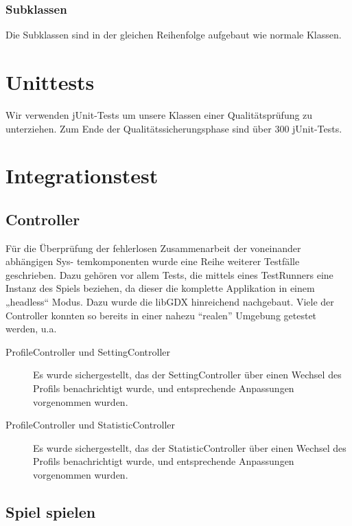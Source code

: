 \documentclass[parskip=full]{scrreprt}
\begin{document}
\subsection{Subklassen}
Die Subklassen sind in der gleichen Reihenfolge aufgebaut wie normale Klassen.



\chapter{Unittests}

Wir verwenden jUnit-Tests um unsere Klassen einer Qualitätsprüfung zu unterziehen. Zum Ende der Qualitätssicherungsphase sind über 300 jUnit-Tests.

\chapter{Integrationstest}



\section{Controller}

Für die Überprüfung der fehlerlosen Zusammenarbeit der voneinander abhängigen Sys- temkomponenten wurde eine Reihe weiterer Testfälle geschrieben. Dazu gehören vor allem Tests, die mittels eines TestRunners eine Instanz des Spiels beziehen, da dieser die komplette Applikation in einem „headless“ Modus. Dazu wurde die libGDX hinreichend nachgebaut. Viele der Controller konnten so bereits in einer nahezu \enquote{realen} Umgebung getestet werden, u.a.

\begin{description}
	\item[ProfileController und SettingController] Es wurde sichergestellt, das der SettingController über einen Wechsel des Profils benachrichtigt wurde, und entsprechende Anpassungen vorgenommen wurden.
	\item[ProfileController und StatisticController] Es wurde sichergestellt, das der StatisticController über einen Wechsel des Profils benachrichtigt wurde, und entsprechende Anpassungen vorgenommen wurden.
\end{description}

\section{Spiel spielen}
\end{document}
